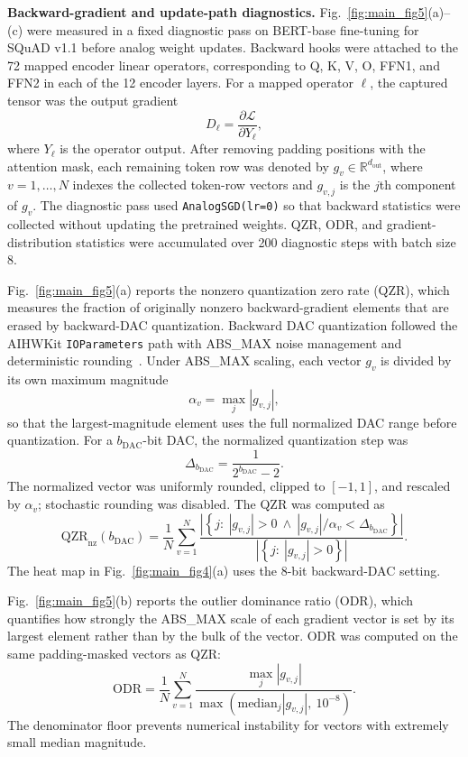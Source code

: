 \documentclass[AMA,LATO2COL]{WileyNJDv5}
\begin{document}
\noindent\textbf{Backward-gradient and update-path diagnostics.}
Fig.~\ref{fig:main_fig5}(a)--(c) were measured in a fixed diagnostic pass on BERT-base fine-tuning for SQuAD v1.1 before analog weight updates. 
Backward hooks were attached to the 72 mapped encoder linear operators, corresponding to Q, K, V, O, FFN1, and FFN2 in each of the 12 encoder layers. 
For a mapped operator \(\ell\), the captured tensor was the output gradient
\[
D_{\ell}=\frac{\partial \mathcal{L}}{\partial Y_{\ell}},
\]
where \(Y_{\ell}\) is the operator output. 
After removing padding positions with the attention mask, each remaining token row was denoted by
\(g_v\in\mathbb{R}^{d_{\mathrm{out}}}\), where \(v=1,\ldots,N\) indexes the collected token-row vectors and \(g_{v,j}\) is the \(j\)th component of \(g_v\). 
The diagnostic pass used \texttt{AnalogSGD(lr=0)} so that backward statistics were collected without updating the pretrained weights. 
QZR, ODR, and gradient-distribution statistics were accumulated over 200 diagnostic steps with batch size 8.

Fig.~\ref{fig:main_fig5}(a) reports the nonzero quantization zero rate (QZR), which measures the fraction of originally nonzero backward-gradient elements that are erased by backward-DAC quantization. 
Backward DAC quantization followed the AIHWKit \texttt{IOParameters} path with ABS\_MAX noise management and deterministic rounding~\cite{rasch2021aihwkit,legallo2023aihwkit}. 
Under ABS\_MAX scaling, each vector \(g_v\) is divided by its own maximum magnitude
\[
\alpha_v=\max_j |g_{v,j}|,
\]
so that the largest-magnitude element uses the full normalized DAC range before quantization. 
For a \(b_{\mathrm{DAC}}\)-bit DAC, the normalized quantization step was
\[
\Delta_{b_{\mathrm{DAC}}}=\frac{1}{2^{b_{\mathrm{DAC}}}-2}.
\]
The normalized vector was uniformly rounded, clipped to \([-1,1]\), and rescaled by \(\alpha_v\); stochastic rounding was disabled. 
The QZR was computed as
\begin{equation}
\mathrm{QZR}_{\mathrm{nz}}(b_{\mathrm{DAC}})
=
\frac{1}{N}
\sum_{v=1}^{N}
\frac{
\left|\left\{j:\ |g_{v,j}|>0\ \wedge\ |g_{v,j}|/\alpha_v < \Delta_{b_{\mathrm{DAC}}}\right\}\right|
}{
\left|\left\{j:\ |g_{v,j}|>0\right\}\right|
}.
\label{eq:qzr_def}
\end{equation}
The heat map in Fig.~\ref{fig:main_fig4}(a) uses the 8-bit backward-DAC setting.

Fig.~\ref{fig:main_fig5}(b) reports the outlier dominance ratio (ODR), which quantifies how strongly the ABS\_MAX scale of each gradient vector is set by its largest element rather than by the bulk of the vector. 
ODR was computed on the same padding-masked vectors as QZR:
\begin{equation}
\mathrm{ODR}
=
\frac{1}{N}
\sum_{v=1}^{N}
\frac{
\max_j |g_{v,j}|
}{
\max\left(\mathrm{median}_j |g_{v,j}|,\ 10^{-8}\right)
}.
\label{eq:odr_def}
\end{equation}
The denominator floor prevents numerical instability for vectors with extremely small median magnitude.
\end{document}
